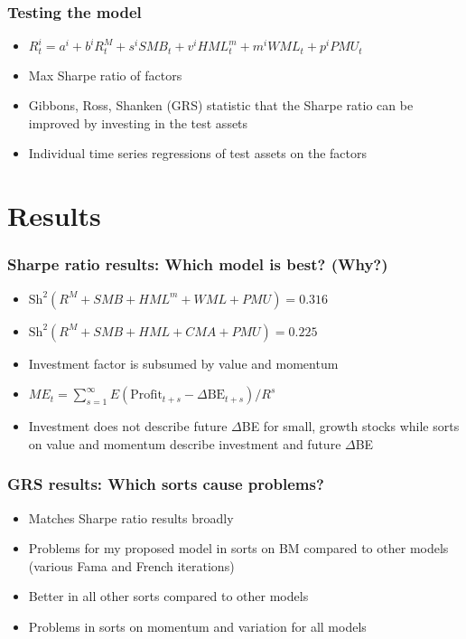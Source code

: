 \documentclass{beamer}
\begin{document}
\begin{frame}
\frametitle{Testing the model}
\begin{itemize}
    \item<1-> $R_t^i = a^i + b^iR_t^M + s^iSMB_t + v^iHML_t^m + m^iWML_t + p^iPMU_t$
    \item<2-> Max Sharpe ratio of factors
    \item<3-> Gibbons, Ross, Shanken (GRS) statistic that the Sharpe ratio
    can be improved by investing in the test assets
    \item<4-> Individual time series regressions of test assets on the factors
\end{itemize}
\end{frame}

\section{Results}

\begin{frame}
\frametitle{Sharpe ratio results: Which model is best? (Why?)}
\begin{itemize}
    \item<1-> $\text{Sh}^2(R^M + SMB + HML^m + WML + PMU)=0.316$
    \item<1-> $\text{Sh}^2(R^M + SMB + HML   + CMA + PMU)=0.225$
    \item<2-> Investment factor is subsumed by value and momentum
    \item<3-> $ME_t = \sum_{s=1}^\infty E\left( \text{Profit}_{t+s} - \Delta\text{BE}_{t+s}\right) /R^s$
    \item<3-> Investment does not describe future $\Delta$BE for small, growth
    stocks while sorts on value and momentum describe investment and future
    $\Delta$BE
\end{itemize}
\end{frame}

\begin{frame}
\frametitle{GRS results: Which sorts cause problems?}
\begin{itemize}
    \item<1-> Matches Sharpe ratio results broadly
    \item<2-> Problems for my proposed model in sorts on BM compared to other
    models (various Fama and French iterations)
    \item<2-> Better in all other sorts compared to other models
    \item<3-> Problems in sorts on momentum and variation for all models
\end{itemize}
\end{frame}
\end{document}
